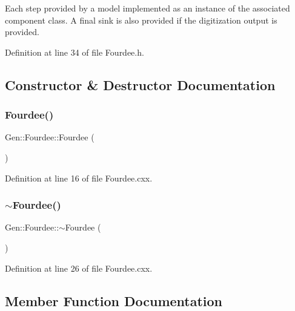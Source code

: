 Each step provided by a model implemented as an instance of the associated component class. A final sink is also provided if the digitization output is provided. 

Definition at line 34 of file Fourdee.\+h.



\subsection{Constructor \& Destructor Documentation}
\mbox{\label{class_wire_cell_1_1_gen_1_1_fourdee_ad0ed7e328ba4dd5aa5c748075d85783c}} 
\subsubsection{\texorpdfstring{Fourdee()}{Fourdee()}}
{\footnotesize\ttfamily Gen\+::\+Fourdee\+::\+Fourdee (\begin{DoxyParamCaption}{ }\end{DoxyParamCaption})}



Definition at line 16 of file Fourdee.\+cxx.

\mbox{\label{class_wire_cell_1_1_gen_1_1_fourdee_ab84cf40afeff0700d886e9c330a844f6}} 
\subsubsection{\texorpdfstring{$\sim$\+Fourdee()}{~Fourdee()}}
{\footnotesize\ttfamily Gen\+::\+Fourdee\+::$\sim$\+Fourdee (\begin{DoxyParamCaption}{ }\end{DoxyParamCaption})\hspace{0.3cm}{\ttfamily [virtual]}}



Definition at line 26 of file Fourdee.\+cxx.



\subsection{Member Function Documentation}
\mbox{\label{class_wire_cell_1_1_gen_1_1_fourdee_a1ec0263b673e8fa7021737cd2ca5fe16}} 
